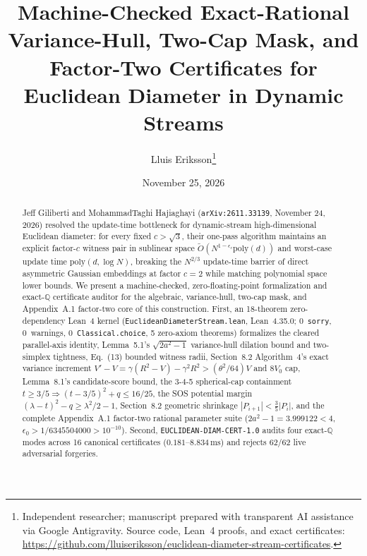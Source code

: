 \documentclass[11pt,twocolumn]{article}
\title{\textbf{Machine-Checked Exact-Rational Variance-Hull, Two-Cap Mask, and Factor-Two Certificates for Euclidean Diameter in Dynamic Streams}}
\author{Lluis Eriksson\thanks{Independent researcher; manuscript prepared with transparent AI assistance via Google Antigravity. Source code, Lean~4 proofs, and exact certificates: \url{https://github.com/lluiseriksson/euclidean-diameter-stream-certificates}.}}
\date{November 25, 2026}
\newcommand{\QQ}{\mathbb{Q}}
\begin{document}
\maketitle

\begin{abstract}
Jeff Giliberti and MohammadTaghi Hajiaghayi (\texttt{arXiv:2611.33139}, November 24, 2026) resolved the update-time bottleneck for dynamic-stream high-dimensional Euclidean diameter: for every fixed $c > \sqrt{3}$, their one-pass algorithm maintains an explicit factor-$c$ witness pair in sublinear space $\tilde{O}(N^{1-\epsilon_c}\mathrm{poly}(d))$ and worst-case update time $\mathrm{poly}(d,\log N)$, breaking the $N^{2/3}$ update-time barrier of direct asymmetric Gaussian embeddings at factor $c=2$ while matching polynomial space lower bounds. We present a machine-checked, zero-floating-point formalization and exact-$\QQ$ certificate auditor for the algebraic, variance-hull, two-cap mask, and Appendix~A.1 factor-two core of this construction. First, an 18-theorem zero-dependency Lean~4 kernel (\texttt{EuclideanDiameterStream.lean}, Lean~4.35.0; 0~\texttt{sorry}, 0~warnings, 0~\texttt{Classical.choice}, 5 zero-axiom theorems) formalizes the cleared parallel-axis identity, Lemma~5.1's $\sqrt{2a^2-1}$ variance-hull dilation bound and two-simplex tightness, Eq.~(13) bounded witness radii, Section~8.2 Algorithm~4's exact variance increment $V' - V = \gamma(R^2-V) - \gamma^2 R^2 > (\theta^2/64)V$ and $8V_0$ cap, Lemma~8.1's candidate-score bound, the 3-4-5 spherical-cap containment $t \ge 3/5 \Rightarrow (t-3/5)^2+q \le 16/25$, the SOS potential margin $(\lambda-t)^2 - q \ge \lambda^2/2 - 1$, Section~8.2 geometric shrinkage $|P_{i+1}| < \frac{3}{5}|P_i|$, and the complete Appendix~A.1 factor-two rational parameter suite ($2a^2-1 = 3.999122 < 4$, $\epsilon_0 > 1/6345504000 > 10^{-10}$). Second, \texttt{EUCLIDEAN-DIAM-CERT-1.0} audits four exact-$\QQ$ modes across 16 canonical certificates ($0.181$--$8.834\,\mathrm{ms}$) and rejects 62/62 live adversarial forgeries.
\end{abstract}
\end{document}

